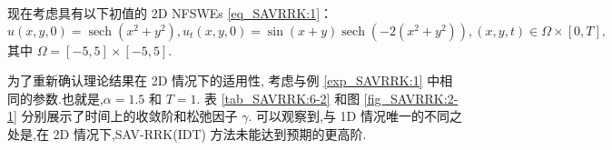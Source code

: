 	\begin{example}\label{exp_SAVRRK:2}
		现在考虑具有以下初值的 2D NFSWEs \eqref{eq_SAVRRK:1}：
		\begin{equation*}
		u(x, y, 0)=\operatorname{sech}\left(x^2+y^2\right), u_t(x, y, 0)=\sin (x+y) \operatorname{sech}\left(-2\left(x^2+y^2\right)\right),(x, y, t) \in \Omega \times[0, T],
		\end{equation*}
		其中 $\Omega=[-5,5] \times[-5,5]$.
		\end{example}
			
			
		为了重新确认理论结果在 2D 情况下的适用性,
		考虑与例 \ref{exp_SAVRRK:1} 中相同的参数.也就是,$\alpha=1.5$ 和 $T=1$.
		表 \ref{tab_SAVRRK:6-2} 和图 \ref{fig_SAVRRK:2-1} 分别展示了时间上的收敛阶和松弛因子 $\gamma$.
		可以观察到,与 1D 情况唯一的不同之处是,在 2D 情况下,SAV-RRK(IDT) 方法未能达到预期的更高阶.


